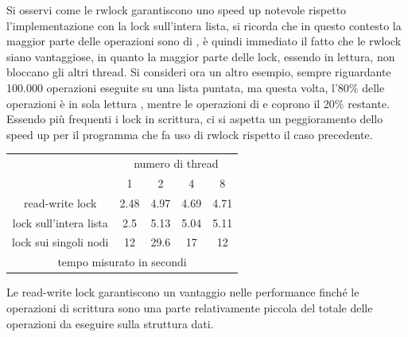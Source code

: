 \documentclass[10pt, letterpaper]{report}
\begin{document}
Si osservi come le rwlock garantiscono uno speed up notevole rispetto l'implementazione con la lock sull'intera lista, si ricorda che in questo contesto la maggior parte delle operazioni sono di , è quindi immediato il fatto che le rwlock siano vantaggiose, in quanto la maggior parte delle lock, essendo in lettura, non bloccano gli altri thread.\acc 
Si consideri ora un altro esempio, sempre riguardante 100.000 operazioni eseguite su una lista puntata, ma questa volta, l'80\% delle operazioni è in sola lettura , mentre le operazioni di  e  coprono il 20\% restante. Essendo più frequenti i lock in scrittura, ci si aspetta un peggioramento dello speed up per il programma che fa uso di rwlock rispetto il caso precedente.\begin{center}
    \begin{tabular}{ccccc}
        \cline{2-5}
        \multicolumn{1}{c|}{}                                                & \multicolumn{4}{c|}{\cellcolor[HTML]{ECF4FF}numero di thread}                                                                                                                                     \\ \cline{2-5} 
        \multicolumn{1}{c|}{}                                                & \multicolumn{1}{c|}{\cellcolor[HTML]{ECF4FF}1} & \multicolumn{1}{c|}{\cellcolor[HTML]{ECF4FF}2} & \multicolumn{1}{c|}{\cellcolor[HTML]{ECF4FF}4} & \multicolumn{1}{c|}{\cellcolor[HTML]{ECF4FF}8} \\ \hline
        \multicolumn{1}{|c|}{\cellcolor[HTML]{FFDFB9}read-write lock}        & \multicolumn{1}{c|}{2.48}                      & \multicolumn{1}{c|}{4.97}                      & \multicolumn{1}{c|}{4.69}                      & \multicolumn{1}{c|}{4.71}                      \\ \hline
        \multicolumn{1}{|c|}{\cellcolor[HTML]{FFDFB9}lock sull'intera lista} & \multicolumn{1}{c|}{2.5}                       & \multicolumn{1}{c|}{5.13}                      & \multicolumn{1}{c|}{5.04}                      & \multicolumn{1}{c|}{5.11}                      \\ \hline
        \multicolumn{1}{|c|}{\cellcolor[HTML]{FFDFB9}lock sui singoli nodi}  & \multicolumn{1}{c|}{12}                        & \multicolumn{1}{c|}{29.6}                      & \multicolumn{1}{c|}{17}                        & \multicolumn{1}{c|}{12}                        \\ \hline
        \multicolumn{5}{c}{tempo misurato in secondi}                                                                                                                                                                                                                           
        \end{tabular}
\end{center}
Le read-write lock garantiscono un vantaggio nelle performance finché le operazioni di scrittura sono una parte relativamente piccola del totale delle operazioni da eseguire sulla struttura dati.
\flowerLine 
\end{document}
